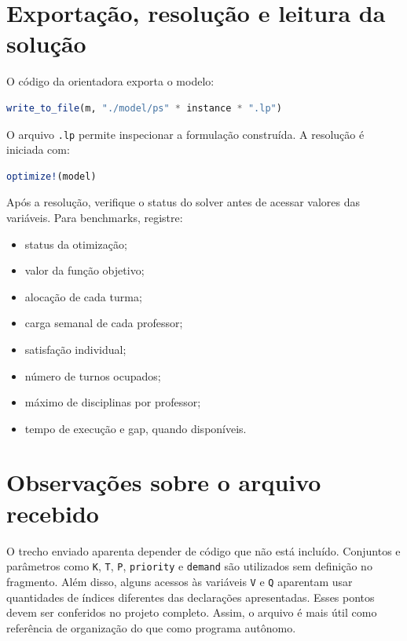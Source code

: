 \documentclass[11pt,a4paper]{article}
\begin{document}
\section{Exportação, resolução e leitura da solução}
O código da orientadora exporta o modelo:
\begin{lstlisting}[language=Julia]
write_to_file(m, "./model/ps" * instance * ".lp")
\end{lstlisting}
O arquivo \texttt{.lp} permite inspecionar a formulação construída. A resolução é iniciada com:
\begin{lstlisting}[language=Julia]
optimize!(model)
\end{lstlisting}
Após a resolução, verifique o status do solver antes de acessar valores das variáveis. Para benchmarks, registre:
\begin{itemize}
\item status da otimização;
\item valor da função objetivo;
\item alocação de cada turma;
\item carga semanal de cada professor;
\item satisfação individual;
\item número de turnos ocupados;
\item máximo de disciplinas por professor;
\item tempo de execução e gap, quando disponíveis.
\end{itemize}

\section{Observações sobre o arquivo recebido}
O trecho enviado aparenta depender de código que não está incluído. Conjuntos e parâmetros como \texttt{K}, \texttt{T}, \texttt{P}, \texttt{priority} e \texttt{demand} são utilizados sem definição no fragmento. Além disso, alguns acessos às variáveis \texttt{V} e \texttt{Q} aparentam usar quantidades de índices diferentes das declarações apresentadas. Esses pontos devem ser conferidos no projeto completo. Assim, o arquivo é mais útil como referência de organização do que como programa autônomo.
\end{document}
